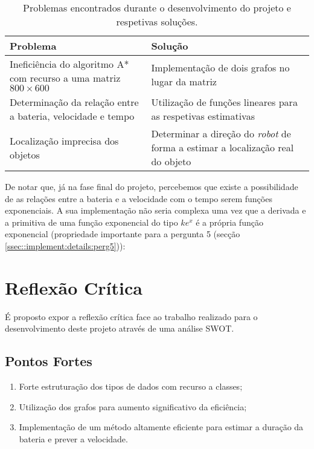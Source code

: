 \begin{table}[!htbp]
	\centering
	\begin{tabular}{p{} p{}}
		\toprule
		{\bfseries Problema} & {\bfseries Solução} \\
		\midrule
		\midrule
		Ineficiência do algoritmo A* com recurso a uma matriz $800 \times 600$ & Implementação de dois grafos no lugar da matriz \\
		\midrule
		Determinação da relação entre a bateria, velocidade e tempo & Utilização de funções lineares para as respetivas estimativas \\
		\midrule
		Localização imprecisa dos objetos & Determinar a direção do \emph{robot} de forma a estimar a localização real do objeto \\
		\bottomrule
	\end{tabular}
	\caption[Problemas encontrados e respetivas soluções]{Problemas encontrados durante o desenvolvimento do projeto e respetivas soluções.}
	\label{tab::problemas}
\end{table}

De notar que, já na fase final do projeto, percebemos que existe a possibilidade de as relações entre a bateria e a velocidade com o tempo serem funções exponenciais. A sua implementação não seria complexa uma vez que a derivada e a primitiva de uma função exponencial do tipo $ke^x$ é a própria função exponencial (propriedade importante para a pergunta 5 (secção \ref{ssec::implement:details:perg5})):



\section{Reflexão Crítica}
\label{sec::reflexao:critica}

É proposto expor a reflexão crítica face ao trabalho realizado para o desenvolvimento deste projeto através de uma análise \ac{SWOT}.


\subsection{Pontos Fortes}
\label{ssec::reflexao:critica:fortes}

\begin{enumerate}
	\item Forte estruturação dos tipos de dados com recurso a classes;
	
	\item Utilização dos grafos para aumento significativo da eficiência;
	
	\item Implementação de um método altamente eficiente para estimar a duração da bateria e prever a velocidade.
\end{enumerate}


